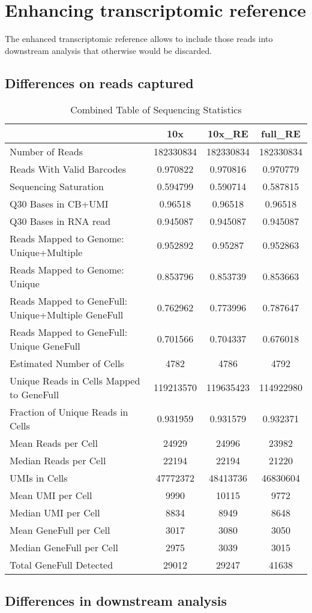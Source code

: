 \section{Enhancing transcriptomic reference}

The enhanced transcriptomic reference allows to include those reads into downstream analysis that otherwise would be discarded.

\subsection{Differences on reads captured}

\begin{table}
  \centering
  \begin{tabular}{|l|ccc|}
  \hline
   & \textbf{10x} & \textbf{10x\_RE} & \textbf{full\_RE} \\
  \hline
Number of Reads & 182330834 & 182330834 & 182330834 \\
Reads With Valid Barcodes & 0.970822 & 0.970816 & 0.970779 \\
Sequencing Saturation & 0.594799 & 0.590714 & 0.587815 \\
Q30 Bases in CB+UMI & 0.96518 & 0.96518 & 0.96518 \\
Q30 Bases in RNA read & 0.945087 & 0.945087 & 0.945087 \\
Reads Mapped to Genome: Unique+Multiple & 0.952892 & 0.95287 & 0.952863 \\
Reads Mapped to Genome: Unique & 0.853796 & 0.853739 & 0.853663 \\
Reads Mapped to GeneFull: Unique+Multiple GeneFull & 0.762962 & 0.773996 & 0.787647 \\
Reads Mapped to GeneFull: Unique GeneFull & 0.701566 & 0.704337 & 0.676018 \\
Estimated Number of Cells & 4782 & 4786 & 4792 \\
Unique Reads in Cells Mapped to GeneFull & 119213570 & 119635423 & 114922980 \\
Fraction of Unique Reads in Cells & 0.931959 & 0.931579 & 0.932371 \\
Mean Reads per Cell & 24929 & 24996 & 23982 \\
Median Reads per Cell & 22194 & 22194 & 21220 \\
UMIs in Cells & 47772372 & 48413736 & 46830604 \\
Mean UMI per Cell & 9990 & 10115 & 9772 \\
Median UMI per Cell & 8834 & 8949 & 8648 \\
Mean GeneFull per Cell & 3017 & 3080 & 3050 \\
Median GeneFull per Cell & 2975 & 3039 & 3015 \\
Total GeneFull Detected & 29012 & 29247 & 41638 \\
\hline
  \end{tabular}
  \caption{Combined Table of Sequencing Statistics}
  \label{tab:PBMCstats}
\end{table}

\subsection{Differences in downstream analysis}
